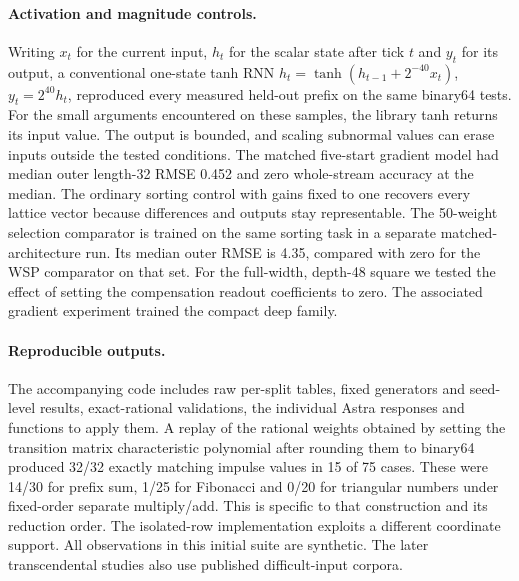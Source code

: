 \paragraph{Activation and magnitude controls.} Writing \(x_t\) for the current input, \(h_t\) for the scalar state after tick \(t\) and \(y_t\) for its output, a conventional one-state tanh RNN \(h_t=\tanh(h_{t-1}+2^{-40}x_t)\), \(y_t=2^{40}h_t\), reproduced every measured held-out prefix on the same binary64 tests. For the small arguments encountered on these samples, the library tanh returns its input value. The output is bounded, and scaling subnormal values can erase inputs outside the tested conditions. The matched five-start gradient model had median outer length-32 RMSE 0.452 and zero whole-stream accuracy at the median. The ordinary sorting control with gains fixed to one recovers every lattice vector because differences and outputs stay representable. The 50-weight selection comparator is trained on the same sorting task in a separate matched-architecture run. Its median outer RMSE is 4.35, compared with zero for the WSP comparator on that set. For the full-width, depth-48 square we tested the effect of setting the compensation readout coefficients to zero. The associated gradient experiment trained the compact deep family.

\paragraph{Reproducible outputs.} The accompanying code includes raw per-split tables, fixed generators and seed-level results, exact-rational validations, the individual Astra responses and functions to apply them. A replay of the rational weights obtained by setting the transition matrix characteristic polynomial after rounding them to binary64 produced 32/32 exactly matching impulse values in 15 of 75 cases. These were 14/30 for prefix sum, 1/25 for Fibonacci and 0/20 for triangular numbers under fixed-order separate multiply/add. This is specific to that construction and its reduction order. The isolated-row implementation exploits a different coordinate support. All observations in this initial suite are synthetic. The later transcendental studies also use published difficult-input corpora.


